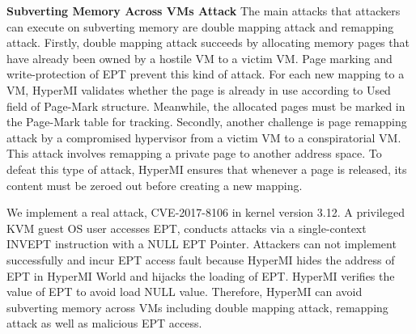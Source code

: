 \documentclass[conference]{IEEEtran}
\begin{document}
\textbf{Subverting Memory Across VMs Attack}
%
The main attacks that attackers can execute on subverting memory are double mapping attack and remapping attack.
Firstly, double mapping attack succeeds by allocating memory pages that have already been owned by a hostile VM to a victim VM. Page marking and write-protection of EPT prevent this kind of attack. For each new mapping to a VM, HyperMI validates whether the page is already in use according to Used field of Page-Mark structure. Meanwhile, the allocated pages must be marked in the Page-Mark table for tracking. Secondly, another challenge is page remapping attack by a compromised hypervisor from a victim VM to a conspiratorial VM. This attack involves remapping a private page to another address space. To defeat this type of attack, HyperMI ensures that whenever a page is released, its content must be zeroed out before creating a new mapping.


We implement a real attack, CVE-2017-8106 in kernel version 3.12. A privileged KVM guest OS user accesses EPT, conducts attacks via a single-context INVEPT instruction with a NULL EPT Pointer. Attackers can not implement successfully and incur EPT access fault because HyperMI hides the address of EPT in HyperMI World and hijacks the loading of EPT. HyperMI verifies the value of EPT to avoid load NULL value. Therefore, HyperMI can avoid subverting memory across VMs including double mapping attack, remapping attack as well as malicious EPT access.
\end{document}
